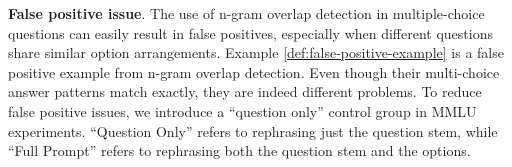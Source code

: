 \textbf{False positive issue}. The use of n-gram overlap detection in multiple-choice questions can easily result in false positives, especially when different questions share similar option arrangements.
Example \ref{def:false-positive-example} is a false positive example from n-gram overlap detection. Even though their multi-choice answer patterns match exactly, they are indeed different problems.
To reduce false positive issues, we introduce a ``question only'' control group in MMLU experiments. 
``Question Only'' refers to rephrasing just the question stem, while ``Full Prompt'' refers to rephrasing both the question stem and the options.



